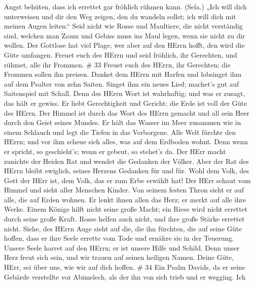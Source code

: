Angst behüten, dass ich errettet gar fröhlich rühmen kann. (Sela.)
 „Ich will dich unterweisen und dir den Weg zeigen, den du
wandeln sollst; ich will dich mit meinen Augen leiten.`` 
Seid nicht wie Rosse und Maultiere, die nicht verständig sind, welchen
man Zaum und Gebiss muss ins Maul legen, wenn sie nicht zu dir wollen.
 Der Gottlose hat viel Plage; wer aber auf den HErrn hofft,
den wird die Güte umfangen.  Freuet euch des HErrn und seid
fröhlich, ihr Gerechten, und rühmet, alle ihr Frommen. \# 33
 Freuet euch des HErrn, ihr Gerechten; die Frommen sollen
ihn preisen.  Danket dem HErrn mit Harfen und lobsinget ihm
auf dem Psalter von zehn Saiten.  Singet ihm ein neues Lied;
machet's gut auf Saitenspiel mit Schall.  Denn des HErrn
Wort ist wahrhaftig; und was er zusagt, das hält er gewiss. 
Er liebt Gerechtigkeit und Gericht; die Erde ist voll der Güte des
HErrn.  Der Himmel ist durch das Wort des HErrn gemacht und
all sein Heer durch den Geist seines Mundes.  Er hält das
Wasser im Meer zusammen wie in einem Schlauch und legt die Tiefen in das
Verborgene.  Alle Welt fürchte den HErrn; und vor ihm scheue
sich alles, was auf dem Erdboden wohnt.  Denn wenn er
spricht, so geschieht's; wenn er gebeut, so stehet's da. 
Der HErr macht zunichte der Heiden Rat und wendet die Gedanken der
Völker.  Aber der Rat des HErrn bleibt ewiglich, seines
Herzens Gedanken für und für.  Wohl dem Volk, des Gott der
HErr ist, dem Volk, das er zum Erbe erwählt hat!  Der HErr
schaut vom Himmel und sieht aller Menschen Kinder.  Von
seinem festen Thron sieht er auf alle, die auf Erden wohnen.
 Er lenkt ihnen allen das Herz; er merkt auf alle ihre
Werke.  Einem Könige hilft nicht seine große Macht; ein
Riese wird nicht errettet durch seine große Kraft.  Rosse
helfen auch nicht, und ihre große Stärke errettet nicht. 
Siehe, des HErrn Auge sieht auf die, die ihn fürchten, die auf seine
Güte hoffen,  dass er ihre Seele errette vom Tode und
ernähre sie in der Teuerung.  Unsere Seele harret auf den
HErrn; er ist unsere Hilfe und Schild.  Denn unser Herz
freut sich sein, und wir trauen auf seinen heiligen Namen. 
Deine Güte, HErr, sei über uns, wie wir auf dich hoffen. \# 34
 Ein Psalm Davids, da er seine Gebärde verstellte vor
Abimelech, als der ihn von sich trieb und er wegging.  Ich
